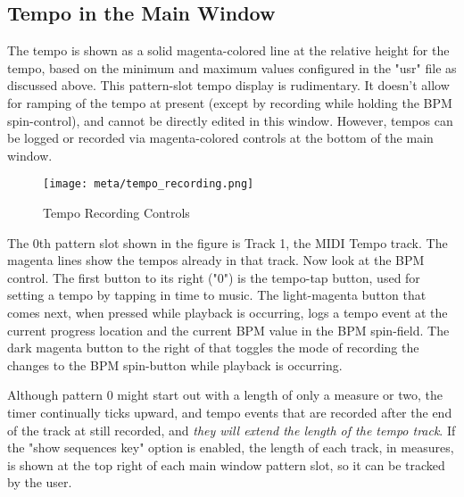 \subsection{Tempo in the Main Window}
\label{subsec:meta_events_mainwid}

%
%

The tempo is shown as a solid magenta-colored line at the relative height
for the tempo,
based on the minimum and maximum values configured in the "usr" file as
discussed above.
This pattern-slot tempo display is rudimentary.  It doesn't allow for ramping
of the tempo at present (except by recording while holding the BPM
spin-control), and cannot be directly edited in this window.
However, tempos can be logged or recorded via magenta-colored controls at the
bottom of the main window.

\begin{figure}[H]
   \centering 
   \texttt{[image: meta/tempo\_recording.png]}
   \caption{Tempo Recording Controls}
   \label{fig:meta_events_mainwid_tempo_recording}
\end{figure}

The 0th pattern slot shown in the figure is Track 1, the
MIDI Tempo track.  The magenta lines show the tempos already in that track.
Now look at the BPM control.  The first button to its right ("0") is the
tempo-tap button, used for setting a tempo by tapping in time to music.
The light-magenta button that comes next, when pressed while playback is
occurring, logs a tempo event at the current progress location and the
current BPM value in the BPM spin-field.  The dark magenta button to the right
of that toggles the mode of recording the changes to the BPM spin-button while
playback is occurring.

Although pattern 0 might start out with a length of only a
measure or two, the timer continually ticks upward, and tempo events that
are recorded after the end of the track at still recorded, and
\textsl{they will extend the length of the tempo track}.
If the "show sequences key" option is enabled, the length of each track, in
measures, is shown at the top right of each main window pattern slot, so it can
be tracked by the user.

